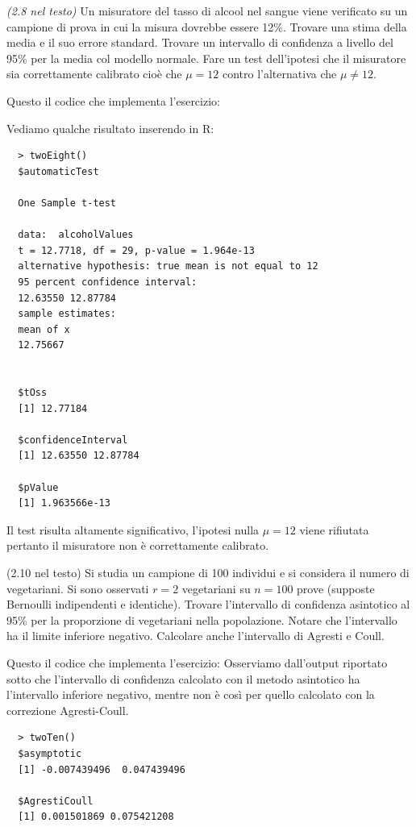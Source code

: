 \begin{exercise}{\emph{(2.8 nel testo)}}
  Un misuratore del tasso di alcool nel sangue viene verificato su un
  campione di prova in cui la misura dovrebbe essere 12\%. Trovare una
  stima della media e il suo errore standard. Trovare un intervallo di
  confidenza a livello del 95\% per la media col modello normale. Fare
  un test dell'ipotesi che il misuratore sia correttamente calibrato
  cio\`e che $\mu = 12$ contro l'alternativa che $\mu \not = 12$.
\end{exercise}
Questo il codice che implementa l'esercizio:

Vediamo qualche risultato inserendo in R:
\begin{lstlisting}
  > twoEight()
  $automaticTest

  One Sample t-test

  data:  alcoholValues 
  t = 12.7718, df = 29, p-value = 1.964e-13
  alternative hypothesis: true mean is not equal to 12 
  95 percent confidence interval:
  12.63550 12.87784 
  sample estimates:
  mean of x 
  12.75667 


  $tOss
  [1] 12.77184

  $confidenceInterval
  [1] 12.63550 12.87784

  $pValue
  [1] 1.963566e-13
\end{lstlisting}
Il test risulta altamente significativo, l'ipotesi nulla $\mu=12$
viene rifiutata pertanto il misuratore non \`e correttamente
calibrato.


\begin{exercise}{(2.10 nel testo)}
  Si studia un campione di 100 individui e si considera il numero di
  vegetariani.  Si sono osservati $r = 2$ vegetariani su $n = 100$
  prove (supposte Bernoulli indipendenti e identiche). Trovare
  l'intervallo di confidenza asintotico al 95\% per la proporzione di
  vegetariani nella popolazione. Notare che l'intervallo ha il limite
  inferiore negativo. Calcolare anche l'intervallo di Agresti e Coull.
\end{exercise}
Questo il codice che implementa l'esercizio:
 Osserviamo
dall'output riportato sotto che l'intervallo di confidenza calcolato
con il metodo asintotico ha l'intervallo inferiore negativo, mentre
non \`e cos\`i per quello calcolato con la correzione Agresti-Coull.
\begin{lstlisting}
  > twoTen()
  $asymptotic
  [1] -0.007439496  0.047439496

  $AgrestiCoull
  [1] 0.001501869 0.075421208
\end{lstlisting}
